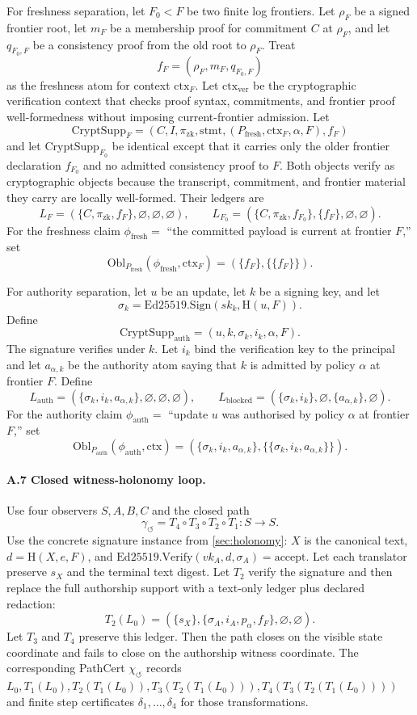 \documentclass[11pt,twoside]{article}
\theoremstyle{definition}
\newcommand{\Obl}{\mathrm{Obl}}
\newcommand{\CryptSupp}{\mathrm{CryptSupp}}
\newcommand{\ctx}{\mathrm{ctx}}
\newcommand{\fresh}{\mathrm{fresh}}
\begin{document}
For freshness separation, let $F_0<F$ be two finite log frontiers. Let
$\rho_F$ be a signed frontier root, let $m_F$ be a membership proof for
commitment $C$ at $\rho_F$, and let $q_{F_0,F}$ be a consistency proof from
the old root to $\rho_F$. Treat
\[
  f_F=(\rho_F,m_F,q_{F_0,F})
\]
as the freshness atom for context $\ctx_F$. Let $\ctx_{\mathrm{ver}}$ be the
cryptographic verification context that checks proof syntax, commitments, and
frontier proof well-formedness without imposing current-frontier admission.
Let
\[
  \CryptSupp_F=(C,I,\pi_{\mathrm{zk}},\mathrm{stmt},(P_{\fresh},\ctx_F,\alpha,F),f_F)
\]
and let $\CryptSupp_{F_0}$ be identical except that it carries only the older
frontier declaration $f_{F_0}$ and no admitted consistency proof to $F$. Both
objects verify as cryptographic objects because the transcript, commitment, and
frontier material they carry are locally well-formed. Their ledgers are
\[
  L_F=(\{C,\pi_{\mathrm{zk}},f_F\},\varnothing,\varnothing,\varnothing),
  \qquad
  L_{F_0}=(\{C,\pi_{\mathrm{zk}},f_{F_0}\},\{f_F\},\varnothing,\varnothing).
\]
For the freshness claim $\phi_{\fresh}=$ ``the committed payload is current at
frontier $F$,'' set
\[
  \Obl_{P_{\fresh}}(\phi_{\fresh},\ctx_F)=(\{f_F\},\{\{f_F\}\}).
\]

For authority separation, let $u$ be an update, let $k$ be a signing key, and
let
\[
  \sigma_k=\mathrm{Ed25519.Sign}(sk_k,\mathrm{H}(u,F)).
\]
Define
\[
  \CryptSupp_{\mathrm{auth}}=(u,k,\sigma_k,i_k,\alpha,F).
\]
The signature verifies under $k$. Let $i_k$ bind the verification key to the
principal and let $a_{\alpha,k}$ be the authority atom saying that $k$ is
admitted by policy $\alpha$ at frontier $F$. Define
\[
  L_{\mathrm{auth}}=(\{\sigma_k,i_k,a_{\alpha,k}\},\varnothing,\varnothing,\varnothing),
  \qquad
  L_{\mathrm{blocked}}=(\{\sigma_k,i_k\},\varnothing,\{a_{\alpha,k}\},\varnothing).
\]
For the authority claim $\phi_{\mathrm{auth}}=$ ``update $u$ was authorised by
policy $\alpha$ at frontier $F$,'' set
\[
  \Obl_{P_{\mathrm{auth}}}(\phi_{\mathrm{auth}},\ctx)
  =
  (\{\sigma_k,i_k,a_{\alpha,k}\},
   \{\{\sigma_k,i_k,a_{\alpha,k}\}\}).
\]

\paragraph{A.7 Closed witness-holonomy loop.}
Use four observers $S,A,B,C$ and the closed path
\[
  \gamma_{\circlearrowleft}=T_4\circ T_3\circ T_2\circ T_1:S\to S.
\]
Use the concrete signature instance from \cref{sec:holonomy}: $X$ is the
canonical text, $d=\mathrm{H}(X,e,F)$, and
$\mathrm{Ed25519.Verify}(vk_A,d,\sigma_A)=\mathrm{accept}$. Let each translator
preserve $s_X$ and the terminal text digest. Let $T_2$ verify the signature and
then replace the full authorship support with a text-only ledger plus declared
redaction:
\[
  T_2(L_0)=
  (\{s_X\},
   \{\sigma_A,i_A,p_\alpha,f_F\},
   \varnothing,\varnothing).
\]
Let $T_3$ and $T_4$ preserve this ledger. Then the path closes on the visible
state coordinate and fails to close on the authorship witness coordinate. The
corresponding PathCert $\chi_{\circlearrowleft}$ records
$L_0,T_1(L_0),T_2(T_1(L_0)),T_3(T_2(T_1(L_0))),T_4(T_3(T_2(T_1(L_0))))$ and
finite step certificates $\delta_1,\ldots,\delta_4$ for those transformations.
\end{document}
